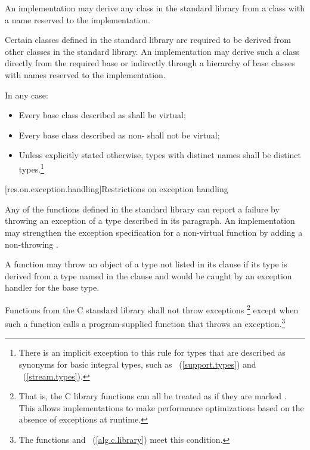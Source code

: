\pnum
{}%
%
An implementation may derive any class in the \Cpp standard library from a class with a
name reserved to the implementation.

\pnum
Certain classes defined in the \Cpp standard library are required to be derived from
other classes
in the \Cpp standard library.
%
An implementation may derive such a class directly from the required base or indirectly
through a hierarchy of base classes with names reserved to the implementation.

\pnum
In any case:

\begin{itemize}
\item
Every base class described as
shall be virtual;
%
\item
Every base class described as
non-
shall not be virtual;
%
\item
Unless explicitly stated otherwise, types with distinct names shall be distinct
types.\footnote{There is an implicit exception to this rule for types that are
described as synonyms for basic integral types, such as
~(\ref{support.types}) and
~(\ref{stream.types}).}
\end{itemize}

[res.on.exception.handling]{Restrictions on exception handling}%
%

\pnum
Any of the functions defined in the \Cpp standard library
%
can report a failure by throwing an exception of a type described in its
paragraph.
An implementation may strengthen the
exception specification
for a
non-virtual
function by adding a non-throwing .

\pnum
A function may throw an object of a type not listed in its 
clause if its type is derived from a type named in the  clause
and would be caught by an exception handler for the base type.

\pnum
Functions from the C standard library shall not throw exceptions%
\footnote{That is, the C
library functions can all be treated as if they
are marked .
This allows implementations to make performance optimizations
based on the absence of exceptions at runtime.}
except when such a function calls a program-supplied function that throws an
exception.\footnote{The functions
and
~(\ref{alg.c.library}) meet this condition.}

